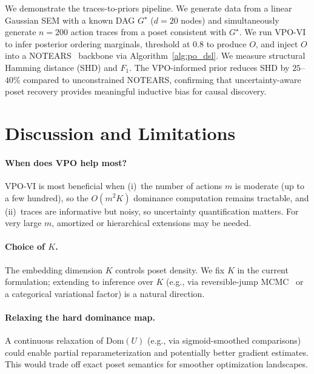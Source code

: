 \documentclass{article}
\theoremstyle{definition}
\theoremstyle{remark}
\newcommand{\Dom}{\mathrm{Dom}}
\begin{document}
We demonstrate the traces-to-priors pipeline.
We generate data from a linear Gaussian SEM with a known DAG $G^\star$
($d=20$ nodes) and simultaneously generate $n=200$ action traces from
a poset consistent with $G^\star$.
We run VPO-VI to infer posterior ordering marginals, threshold at $0.8$
to produce $O$, and inject $O$ into a NOTEARS~\citep{zheng2018notears}
backbone via Algorithm~\ref{alg:po_dsl}.
We measure structural Hamming distance (SHD) and $F_1$.
The VPO-informed prior reduces SHD by $25$--$40\%$ compared to
unconstrained NOTEARS, confirming that uncertainty-aware poset recovery
provides meaningful inductive bias for causal discovery.

\section{Discussion and Limitations}
\label{sec:discussion}

\paragraph{When does VPO help most?}
VPO-VI is most beneficial when (i)~the number of actions $m$ is moderate
(up to a few hundred), so the $O(m^2 K)$ dominance computation remains
tractable, and (ii)~traces are informative but noisy, so uncertainty
quantification matters.
For very large $m$, amortized or hierarchical extensions may be needed.

\paragraph{Choice of $K$.}
The embedding dimension $K$ controls poset density.
We fix $K$ in the current formulation; extending to inference over $K$
(e.g., via reversible-jump MCMC~\citep{green1995reversible} or a
categorical variational factor) is a natural direction.

\paragraph{Relaxing the hard dominance map.}
A continuous relaxation of $\Dom(U)$ (e.g., via sigmoid-smoothed
comparisons) could enable partial reparameterization and potentially
better gradient estimates.
This would trade off exact poset semantics for smoother optimization
landscapes.
\end{document}

